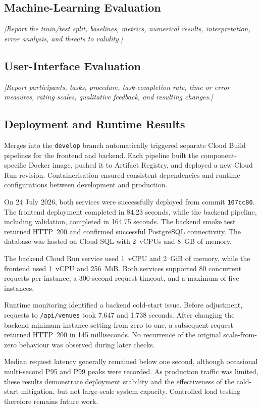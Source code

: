 ﻿\documentclass[conference,a4paper]{IEEEtran}
\begin{document}
\subsection{Machine-Learning Evaluation}
\textit{[Report the train/test split, baselines, metrics, numerical results,
interpretation, error analysis, and threats to validity.]}

\subsection{User-Interface Evaluation}
\textit{[Report participants, tasks, procedure, task-completion rate, time or
error measures, rating scales, qualitative feedback, and resulting changes.]}

\subsection{Deployment and Runtime Results}
\label{sec:deployment-results}

Merges into the \texttt{develop} branch automatically triggered separate Cloud
Build pipelines for the frontend and backend. Each pipeline built the
component-specific Docker image, pushed it to Artifact Registry, and deployed a
new Cloud Run revision. Containerisation ensured consistent dependencies and
runtime configurations between development and production.

On 24 July 2026, both services were successfully deployed from commit
\texttt{107cc80}. The frontend deployment completed in 84.23 seconds, while the
backend pipeline, including validation, completed in 164.75 seconds. The backend
smoke test returned HTTP~200 and confirmed successful PostgreSQL connectivity.
The database was hosted on Cloud SQL with 2~vCPUs and 8~GB of memory.

The backend Cloud Run service used 1~vCPU and 2~GiB of memory, while the frontend
used 1~vCPU and 256~MiB. Both services supported 80 concurrent requests per
instance, a 300-second request timeout, and a maximum of five instances.

Runtime monitoring identified a backend cold-start issue. Before adjustment,
requests to \texttt{/api/venues} took 7.647 and 1.738 seconds. After changing the
backend minimum-instance setting from zero to one, a subsequent request returned
HTTP~200 in 145 milliseconds. No recurrence of the original scale-from-zero
behaviour was observed during later checks.

Median request latency generally remained below one second, although occasional
multi-second P95 and P99 peaks were recorded. As production traffic was limited,
these results demonstrate deployment stability and the effectiveness of the
cold-start mitigation, but not large-scale system capacity. Controlled load
testing therefore remains future work.
\end{document}
